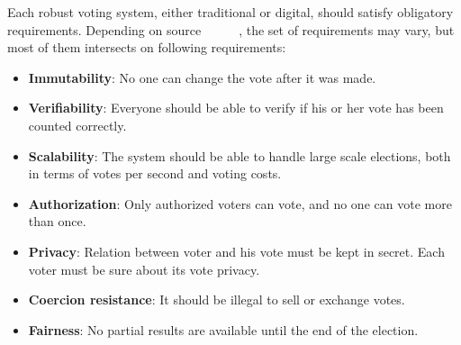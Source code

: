 \documentclass[applsci,article,submit,moreauthors,pdftex]{Definitions/mdpi}
\begin{document}
Each robust voting system, either traditional or digital, should satisfy obligatory requirements. Depending on source~\cite{applied_cryptography}~\cite{sadia2019blockchain}~\cite{hjalmarsson2018blockchain}~\cite{ayed2017conceptual}~\cite{vo2019votereum}~\cite{qadah2005requirements}, the set of requirements may vary, but most of them intersects on following requirements:
\begin{itemize}
\item \textbf{Immutability}: No one can change the vote after it was made.
\item \textbf{Verifiability}: Everyone should be able to verify if his or her vote has been counted correctly.
\item \textbf{Scalability}: The system should be able to handle large scale elections, both in terms of votes per second and voting costs.
\item \textbf{Authorization}: Only authorized voters can vote, and no one can vote more than once.
\item \textbf{Privacy}: Relation between voter and his vote must be kept in secret. 
Each voter must be sure about its vote privacy. 
\item \textbf{Coercion resistance}: It should be illegal to sell or exchange votes.
\item \textbf{Fairness}: No partial results are available until the end of the election.
\end{itemize}
\end{document}
